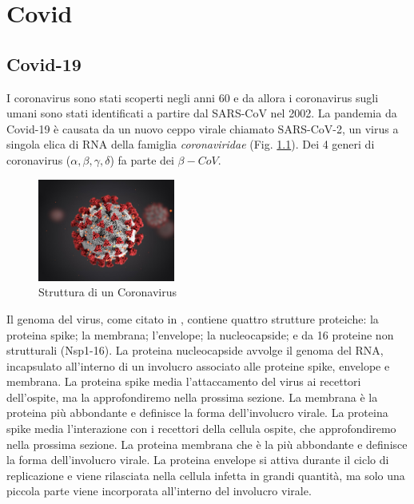 \chapter{Covid}\label{chapter:Covid}

\section{Covid-19}\label{sec:covid19}
I coronavirus sono stati scoperti negli anni 60 e da allora i coronavirus sugli umani sono stati identificati a partire dal SARS-CoV nel 2002. La pandemia da Covid-19 
è causata da un nuovo ceppo virale chiamato SARS-CoV-2, un virus a singola elica di RNA della famiglia \emph{coronaviridae} (Fig. \ref{fig:coronavirus-struttura}). Dei 4 generi di coronavirus ($\alpha, \beta, \gamma, \delta$) fa parte dei $\beta-CoV$. 

\begin{figure}
	\centering
	\includegraphics[width=0.4\textwidth]{Immagini/coronavirus.png}
	\caption{Struttura di un Coronavirus}
	\label{fig:coronavirus-struttura}
\end{figure}

Il genoma del virus, come citato in \cite{ijms22147425}, contiene quattro strutture proteiche: la proteina spike; la membrana; l'envelope; la nucleocapside; e da 16 proteine non strutturali (Nsp1-16). La proteina nucleocapside avvolge il genoma del RNA, incapsulato all'interno di un involucro associato alle proteine spike, envelope e membrana. 
La proteina spike media l'attaccamento del virus ai recettori dell'ospite, ma la approfondiremo nella prossima sezione. La membrana è la proteina più abbondante e definisce la forma dell'involucro virale. La proteina spike media l'interazione con i recettori della cellula ospite, che approfondiremo nella prossima sezione. La proteina membrana che è la più abbondante e definisce la forma dell'involucro virale. La proteina envelope si attiva durante il ciclo di replicazione e viene rilasciata nella cellula infetta in grandi quantità, ma solo una piccola parte viene incorporata all'interno del involucro virale. 

